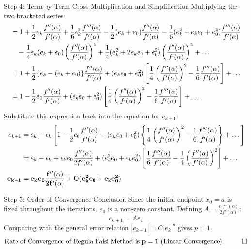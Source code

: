 \documentclass[11pt,a4paper]{article}
\begin{document}
\begin{exbox}{Step 4: Term-by-Term Cross Multiplication and Simplification}
Multiplying the two bracketed series:
\begin{align}
    &= 1 + \frac{1}{2} e_k \frac{f''(\alpha)}{f'(\alpha)} + \frac{1}{6} e_k^2 \frac{f'''(\alpha)}{f'(\alpha)} - \frac{1}{2}(e_k + e_0)\frac{f''(\alpha)}{f'(\alpha)} - \frac{1}{6}(e_k^2 + e_k e_0 + e_0^2)\frac{f'''(\alpha)}{f'(\alpha)} \notag \\
    &\quad - \frac{1}{4} e_k(e_k + e_0)\left(\frac{f''(\alpha)}{f'(\alpha)}\right)^2 + \frac{1}{4}(e_k^2 + 2e_k e_0 + e_0^2)\left(\frac{f''(\alpha)}{f'(\alpha)}\right)^2 + \dots \notag \\
    &= 1 + \frac{1}{2}\{ e_k - (e_k + e_0) \}\frac{f''(\alpha)}{f'(\alpha)} + (e_k e_0 + e_0^2)\left[ \frac{1}{4}\left(\frac{f''(\alpha)}{f'(\alpha)}\right)^2 - \frac{1}{6}\frac{f'''(\alpha)}{f'(\alpha)} \right] + \dots \notag \\
    &= 1 - \frac{1}{2} e_0 \frac{f''(\alpha)}{f'(\alpha)} + (e_k e_0 + e_0^2)\left[ \frac{1}{4}\left(\frac{f''(\alpha)}{f'(\alpha)}\right)^2 - \frac{1}{6}\frac{f'''(\alpha)}{f'(\alpha)} \right] + \dots
\end{align}
Substitute this expression back into the equation for $e_{k+1}$:
\begin{align}
    e_{k+1} &= e_k - e_k \left[ 1 - \frac{1}{2} e_0 \frac{f''(\alpha)}{f'(\alpha)} + (e_k e_0 + e_0^2)\left\{ \frac{1}{4}\left(\frac{f''(\alpha)}{f'(\alpha)}\right)^2 - \frac{1}{6}\frac{f'''(\alpha)}{f'(\alpha)} \right\} + \dots \right] \notag \\
    &= e_k - e_k + e_k e_0 \frac{f''(\alpha)}{2 f'(\alpha)} + (e_k^2 e_0 + e_k e_0^2)\left[ \frac{1}{6}\frac{f'''(\alpha)}{f'(\alpha)} - \frac{1}{4}\left(\frac{f''(\alpha)}{f'(\alpha)}\right)^2 \right] + \dots \notag \\
    \mathbf{e_{k+1}} &= \mathbf{e_k e_0 \frac{f''(\alpha)}{2 f'(\alpha)} + O(e_k^2 e_0 + e_k e_0^2)}
\end{align}
\end{exbox}

\begin{exbox}{Step 5: Order of Convergence Conclusion}
Since the initial endpoint $x_0 = a$ is fixed throughout the iterations, $e_0$ is a non-zero constant. Defining $A = \frac{e_0 f''(\alpha)}{2 f'(\alpha)}$:
\begin{equation}
    e_{k+1} = A e_k
\end{equation}
Comparing with the general error relation $|e_{k+1}| = C |e_k|^p$ gives $p = 1$.
$$\mathbf{\text{Rate of Convergence of Regula-Falsi Method is } p = 1 \text{ (Linear Convergence)}} \quad \qed$$
\end{exbox}
\end{document}

